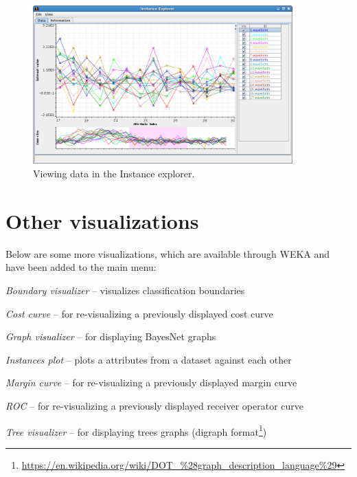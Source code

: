 \begin{figure}[htb]
  \centering
  \includegraphics[width=10.0cm]{images/instance-explorer_view.png}
  \caption{Viewing data in the Instance explorer.}
  \label{instance-explorer_view}
\end{figure}

\clearpage
\section{Other visualizations}
Below are some more visualizations, which are available through WEKA and have
been added to the main menu:
\begin{tight_itemize}
  \item \textit{Boundary visualizer} -- visualizes classification boundaries
  \item \textit{Cost curve} -- for re-visualizing a previously displayed cost curve
  \item \textit{Graph visualizer} -- for displaying BayesNet graphs
  \item \textit{Instances plot} -- plots a attributes from a dataset against each other
  \item \textit{Margin curve} -- for re-visualizing a previously displayed margin curve
  \item \textit{ROC} -- for re-visualizing a previously displayed receiver operator curve
  \item \textit{Tree visualizer} -- for displaying trees graphs (digraph
  format\footnote{\url{https://en.wikipedia.org/wiki/DOT\_\%28graph\_description\_language\%29}{}})
\end{tight_itemize}